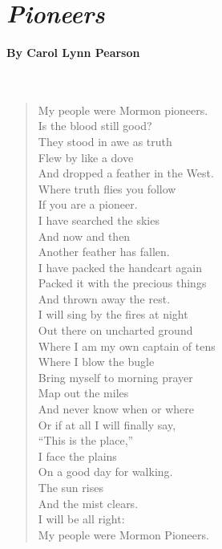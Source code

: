 \documentclass[12pt, openany, letterpaper]{memoir}
\begin{document}
\newpage
\pagestyle{empty}
\addtocounter{page}{-1}	
\section*{\emph{Pioneers}}
\paragraph{By Carol Lynn Pearson}~
\begin{verse}
	My people were Mormon pioneers.\\	
	Is the blood still good?\\	
	They stood in awe as truth\\
	Flew by like a dove\\
	And dropped a feather in the West.\\
	Where truth flies you follow\\	
	If you are a pioneer.\\
	I have searched the skies\\
	And now and then\\
	Another feather has fallen.\\
	I have packed the handcart again\\	
	Packed it with the precious things\\
	And thrown away the rest.\\
	I will sing by the fires at night\\	
	Out there on uncharted ground\\
	Where I am my own captain of tens\\	
	Where I blow the bugle\\
	Bring myself to morning prayer\\
	Map out the miles\\
	And never know when or where\\
	Or if at all I will finally say,\\
	“This is the place,”\\
	I face the plains\\
	On a good day for walking.\\
	The sun rises\\
	And the mist clears.\\
	I will be all right:\\
	My people were Mormon Pioneers.
\end{verse}
\end{document}

